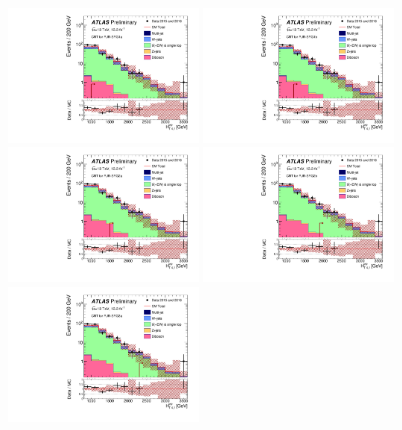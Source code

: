 \begin{figure}[tbph]
\begin{center}
\includegraphics[width=0.45\textwidth]{figures/ATLAS-CONF-2016-078_INT/N-1Plots/AtlasStyle/Preliminary/CRT_SRJigsawSRG1a_LastCut_CRT_minusone}
\includegraphics[width=0.45\textwidth]{figures/ATLAS-CONF-2016-078_INT/N-1Plots/AtlasStyle/Preliminary/CRT_SRJigsawSRG1b_LastCut_CRT_minusone}
\includegraphics[width=0.45\textwidth]{figures/ATLAS-CONF-2016-078_INT/N-1Plots/AtlasStyle/Preliminary/CRT_SRJigsawSRG2a_LastCut_CRT_minusone}
\includegraphics[width=0.45\textwidth]{figures/ATLAS-CONF-2016-078_INT/N-1Plots/AtlasStyle/Preliminary/CRT_SRJigsawSRG2b_LastCut_CRT_minusone}
\includegraphics[width=0.45\textwidth]{figures/ATLAS-CONF-2016-078_INT/N-1Plots/AtlasStyle/Preliminary/CRT_SRJigsawSRG3a_LastCut_CRT_minusone}

\end{center}
\end{figure}
